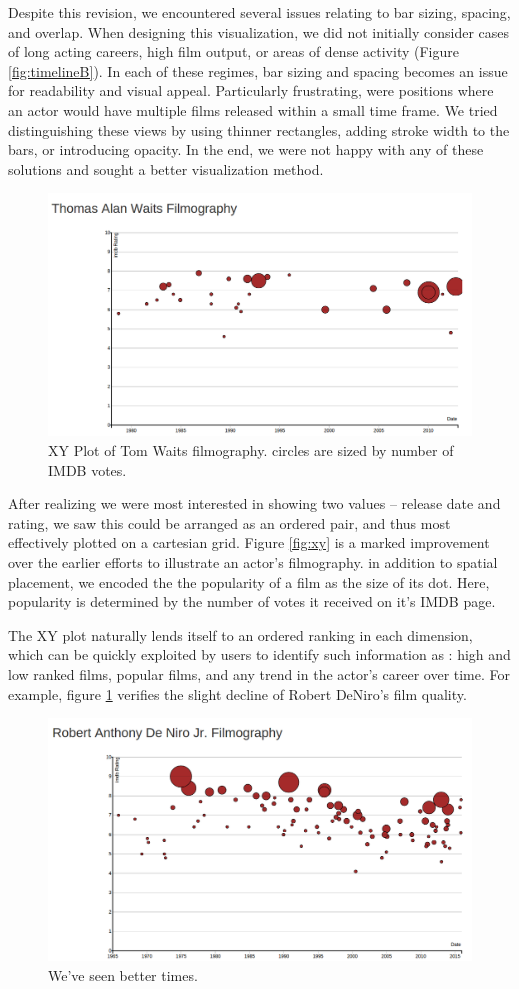 \documentclass[12pt]{article}
\begin{document}
		
Despite this revision, we encountered several issues relating to bar sizing, spacing, and overlap.  When designing this visualization, we did not initially consider cases of long acting careers, high film output, or areas of dense activity (Figure \ref{fig:timelineB}). In each of these regimes, bar sizing and spacing becomes an issue for readability and visual appeal.  Particularly frustrating, were positions where an actor would have multiple films released within a small time frame.  We tried distinguishing these views by using thinner rectangles, adding stroke width to the bars, or introducing opacity.  In the end, we were not happy with any of these solutions and sought a better visualization method.

\begin{figure}
	\centering
	\includegraphics[width=.7\linewidth]{images/timelineC_crop_waits.png}
				  \caption{XY Plot of Tom Waits filmography.  circles are sized by number of  IMDB votes.}
\end{figure}\label{fig:xy}


After realizing we were most interested in showing two values -- release date and rating, we saw this could be arranged as an ordered pair, and thus most effectively plotted on a cartesian grid.  Figure \ref{fig:xy} is a marked improvement over the earlier efforts to illustrate an actor's filmography.  in addition to spatial placement, we encoded the the popularity of a film as the size of its dot.  Here, popularity is determined by the number of votes it received on it's IMDB page.

The XY plot naturally lends itself to an ordered ranking in each dimension, which can be quickly exploited by users to identify such information as : high and low ranked films, popular films, and any trend in the actor's career over time.  For example, figure \ref{fig:deniro} verifies the slight decline of  Robert DeNiro's film quality.

\begin{figure}\label{fig:deniro}
	\centering
	\includegraphics[width=.7\linewidth]{images/Deniro_timeline.png}
				  \caption{We've seen better times.}
\end{figure}
\end{document}
